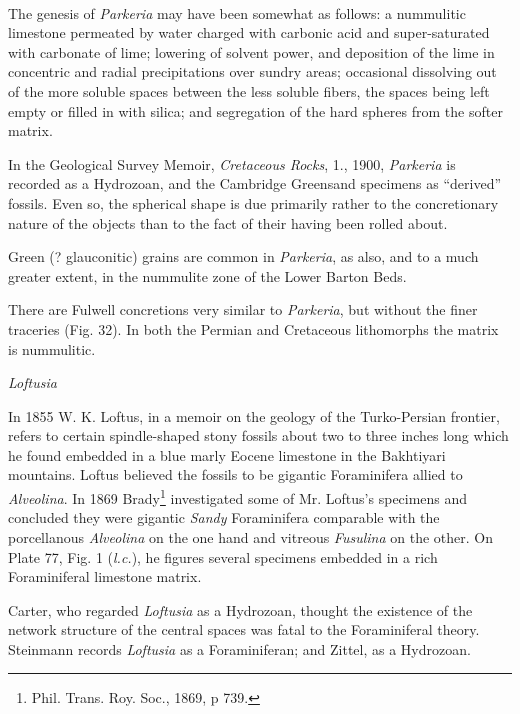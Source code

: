 \documentclass[a4paper, 12pt, oneside]{article}
\begin{document}
\paragraph{}
The genesis of \emph{Parkeria} may have been somewhat as follows: a nummulitic limestone permeated by water charged with carbonic acid and super-saturated with carbonate of lime; lowering of solvent power, and deposition of the lime in concentric and radial precipitations over sundry areas; occasional dissolving out of the more soluble spaces between the less soluble fibers, the spaces being left empty or filled in with silica; and segregation of the hard spheres from the softer matrix.

In the Geological Survey Memoir, \emph{Cretaceous Rocks}, 1., 1900, \emph{Parkeria} is recorded as a Hydrozoan, and the Cambridge Greensand specimens as ``derived'' fossils. Even so, the spherical shape is due primarily rather to the concretionary nature of the objects than to the fact of their having been rolled about.

Green (? glauconitic) grains are common in \emph{Parkeria}, as also, and to a much greater extent, in the nummulite zone of the Lower Barton Beds.

There are Fulwell concretions very similar to \emph{Parkeria}, but without the finer traceries (Fig. 32). In both the Permian and Cretaceous lithomorphs the matrix is nummulitic.

\bigskip
\centerline{\emph{Loftusia}}

In 1855 W. K. Loftus, in a memoir on the geology of the Turko-Persian frontier, refers to certain spindle-shaped stony fossils about two to three inches long which he found embedded in a blue marly Eocene limestone in the Bakhtiyari mountains. Loftus believed the fossils to be gigantic Foraminifera allied to \emph{Alveolina}. In 1869 Brady\footnote{Phil. Trans. Roy. Soc., 1869, p 739.} investigated some of Mr. Loftus's specimens and concluded they were gigantic \emph{Sandy} Foraminifera comparable with the porcellanous \emph{Alveolina} on the one hand and vitreous \emph{Fusulina} on the other. On Plate 77, Fig. 1 (\emph{l.c.}), he figures several specimens embedded in a rich Foraminiferal limestone matrix.

Carter, who regarded \emph{Loftusia} as a Hydrozoan, thought the existence of the network structure of the central spaces was fatal to the Foraminiferal theory. Steinmann records \emph{Loftusia} as a Foraminiferan; and Zittel, as a Hydrozoan.
\end{document}
